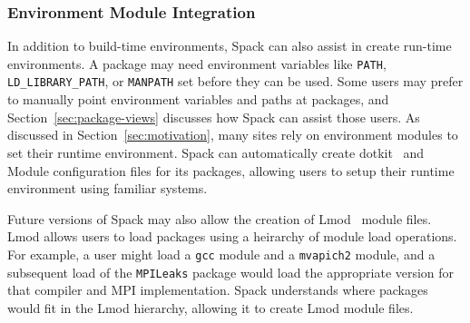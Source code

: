 \subsubsection{Environment Module Integration}
\label{sec:envmodule}
In addition to build-time environments, Spack can also assist in create run-time
environments.  A package may need environment variables like {\tt PATH}, 
{\tt LD_LIBRARY_PATH}, or {\tt MANPATH} set before they can be used.  Some users
may prefer to manually point environment variables and paths at packages, and 
Section~\ref{sec:package-views} discusses how Spack can assist those users.  
As discussed in Section~\ref{sec:motivation}, many sites rely on environment 
modules to set their runtime environment.  Spack can automatically create 
dotkit~\cite{dotkit} and Module configuration files for its packages, allowing 
users to setup their runtime environment using familiar systems.  

Future versions of Spack may also allow the creation of Lmod~\cite{mclay:lmod} 
module files.  Lmod allows users to load packages using a heirarchy of module 
load operations.  For example, a user might load a {\tt gcc} module and a 
{\tt mvapich2} module, and a subsequent load of the {\tt MPILeaks} package would 
load the appropriate version for that compiler and MPI implementation.  Spack 
understands where packages would fit in the Lmod hierarchy, allowing it to create 
Lmod module files.  


